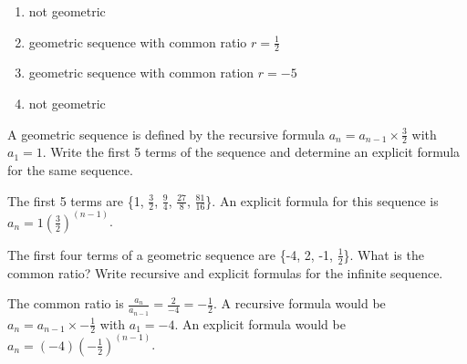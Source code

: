 \begin{Answer}[ref=seq4]
\begin{enumerate}
\item not geometric
\item geometric sequence with common ratio $r = \frac{1}{2}$
\item geometric sequence with common ration $r = -5$
\item not geometric
\end{enumerate}
\end{Answer}

\begin{Exercise}[label=seq5]
A geometric sequence is defined by the recursive formula $a_n = a_{n-1} \times \frac{3}{2}$ with $a_1 = 1$. Write the first 5 terms of the sequence and determine an explicit formula for the same sequence. 
\end{Exercise}

\begin{Answer}[ref=seq5]
The first 5 terms are \{1, $\frac{3}{2}$, $\frac{9}{4}$, $\frac{27}{8}$, $\frac{81}{16}$\}. An explicit formula for this sequence is $a_n = 1(\frac{3}{2})^{(n-1)}$. 
\end{Answer}

\begin{Exercise}[label=seq6]
The first four terms of a geometric sequence are \{-4, 2, -1, $\frac{1}{2}$\}. What is the common ratio? Write recursive and explicit formulas for the infinite sequence. 
\end{Exercise}

\begin{Answer}[ref=seq6]
The common ratio is $\frac{a_{n}}{a_{n-1}} = \frac{2}{-4} = -\frac{1}{2}$. A recursive formula would be $a_n = a_{n-1} \times -\frac{1}{2}$ with $a_1 = -4$. An explicit formula would be $a_n = (-4)(-\frac{1}{2})^{(n-1)}$. 
\end{Answer}


















